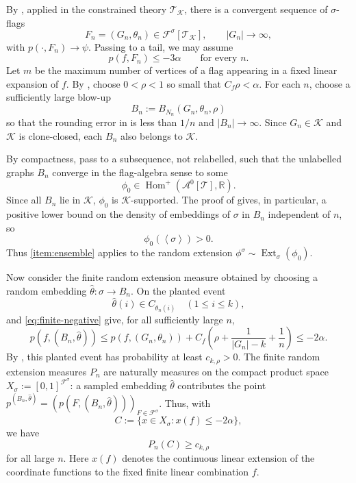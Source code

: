 \documentclass[11pt]{article}
\theoremstyle{definition}
\newcommand{\R}{\mathbb{R}}
\newcommand{\A}{\mathcal{A}}
\newcommand{\F}{\mathcal{F}}
\newcommand{\K}{\mathcal{K}}
\newcommand{\T}{\mathcal{T}}
\newcommand{\Homp}{\operatorname{Hom}^{+}}
\newcommand{\Ext}{\operatorname{Ext}}
\newcommand{\brak}[1]{\left\langle #1\right\rangle}
\begin{document}
By , applied in the constrained theory $\T_\K$, there is a
convergent sequence of $\sigma$-flags
\[
  F_n=(G_n,\theta_n)\in\F^\sigma[\T_\K],
  \qquad |G_n|\to\infty,
\]
with $p(\cdot,F_n)\to\psi$.  Passing to a tail, we may assume
\begin{equation}\label{eq:finite-negative}
  p(f,F_n)\le -3\alpha
  \qquad\text{for every }n.
\end{equation}
Let $m$ be the maximum number of vertices of a flag appearing in a fixed linear
expansion of $f$.  By , choose $0<\rho<1$ so small that
$C_f\rho<\alpha$.  For each $n$, choose a sufficiently large blow-up
\[
  B_n:=B_{N_n}(G_n,\theta_n,\rho)
\]
so that the rounding error in  is less than $1/n$ and
$|B_n|\to\infty$.  Since $G_n\in\K$ and $\K$ is clone-closed, each $B_n$ also belongs to $\K$.

By compactness, pass to a subsequence, not relabelled, such that the unlabelled
graphs $B_n$ converge in the flag-algebra sense to some
\[
  \phi_0\in\Homp(\A^0[\T],\R).
\]
Since all $B_n$ lie in $\K$, $\phi_0$ is $\K$-supported.  The proof of
 gives, in particular, a positive lower bound on the
density of embeddings of $\sigma$ in $B_n$ independent of $n$, so
\[
  \phi_0(\brak\sigma)>0.
\]
Thus \ref{item:ensemble} applies to the random extension
$\phi^\sigma\sim\Ext_\sigma(\phi_0)$.

Now consider the finite random extension measure obtained by choosing a random
embedding $\widehat\theta:\sigma\to B_n$.  On the planted event
\[
  \widehat\theta(i)\in C_{\theta_n(i)}\quad(1\le i\le k),
\]
 and \eqref{eq:finite-negative} give, for all sufficiently
large $n$,
\[
  p(f,(B_n,\widehat\theta))
  \le
  p(f,(G_n,\theta_n))+
  C_f\left(\rho+\frac1{|G_n|-k}+\frac1n\right)
  \le -2\alpha.
\]
By , this planted event has probability at least
$c_{k,\rho}>0$.  The finite random extension measures $P_n$ are naturally
measures on the compact product space
$X_\sigma:=[0,1]^{\F^\sigma}$: a sampled embedding
$\widehat\theta$ contributes the point
$p^{(B_n,\widehat\theta)}=(p(F,(B_n,\widehat\theta)))_{F\in\F^\sigma}$.
Thus, with
\[
  C:=\{x\in X_\sigma:x(f)\le -2\alpha\},
\]
we have
\begin{equation}\label{eq:finite-bad-mass}
  P_n(C)\ge c_{k,\rho}
\end{equation}
for all large $n$.  Here $x(f)$ denotes the continuous linear extension of the
coordinate functions to the fixed finite linear combination $f$.
\end{document}
